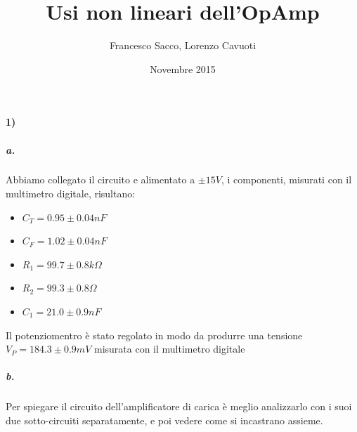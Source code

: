 \documentclass{article}
\date{Novembre 2015}
\author{Francesco Sacco, Lorenzo Cavuoti}
\title{Usi non lineari dell'OpAmp}
\begin{document}
	\maketitle		
	\paragraph{1)}
	\subparagraph{a.}
		Abbiamo collegato il circuito e alimentato a $\pm 15V$, i componenti, misurati con il multimetro digitale, risultano:
		\begin{itemize}
			\item $C_T=0.95\pm0.04 nF$
			\item $C_F=1.02\pm0.04 nF$
			\item $R_1=99.7\pm0.8 k\Omega$
			\item $R_2=99.3\pm0.8 \Omega$
			\item $C_1=21.0\pm0.9 nF$
		\end{itemize}
		Il potenziomentro è stato regolato in modo da produrre una tensione $V_P=184.3\pm0.9 mV$ misurata con il multimetro digitale

	\subparagraph{b.}
		Per spiegare il circuito dell'amplificatore di carica è meglio analizzarlo con i suoi due sotto-circuiti separatamente, e poi vedere come si incastrano assieme.\newline
\end{document}
